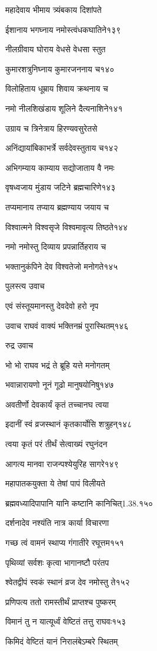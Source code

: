 महादेवाय भीमाय त्र्यंबकाय दिशांपते

ईशानाय भगघ्नाय नमोस्त्वंधकघातिने१३९

नीलग्रीवाय घोराय वेधसे वेधसा स्तुत

कुमारशत्रुनिघ्नाय कुमारजननाय च१४०

विलोहिताय धूम्राय शिवाय क्रथनाय च

नमो नीलशिखंडाय शूलिने दैत्यनाशिने१४१

उग्राय च त्रिनेत्राय हिरण्यवसुरेतसे

अनिंद्यायांबिकाभर्त्रे सर्वदेवस्तुताय च१४२

अभिगम्याय काम्याय सद्योजाताय वै नमः

वृषध्वजाय मुंडाय जटिने ब्रह्मचारिणे१४३

तप्यमानाय तप्याय ब्रह्मण्याय जयाय च

विश्वात्मने विश्वसृजे विश्वमावृत्य तिष्ठते१४४

नमो नमोस्तु दिव्याय प्रपन्नार्तिहराय च

भक्तानुकंपिने देव विश्वतेजो मनोगते१४५

पुलस्त्य उवाच

एवं संस्तूयमानस्तु देवदेवो हरो नृप

उवाच राघवं वाक्यं भक्तिनम्रं पुरास्थितम्१४६

रुद्र उवाच

भो भो राघव भद्रं ते ब्रूहि यत्ते मनोगतम्

भवान्नारायणो नूनं गूढो मानुषयोनिषु१४७

अवतीर्णो देवकार्यं कृतं तच्चानघ त्वया

इदानीं स्वं व्रजस्थानं कृतकार्योसि शत्रुहन्१४८

त्वया कृतं परं तीर्थं सेत्वाख्यं रघुनंदन

आगत्य मानवा राजन्पश्येयुरिह सागरे१४९

महापातकयुक्ता ये तेषां पापं विलीयते

ब्रह्मवध्यादिपापानि यानि कष्टानि कानिचित्1.38.१५०

दर्शनादेव नश्यंति नात्र कार्या विचारणा

गच्छ त्वं वामनं स्थाप्य गंगातीरे रघूत्तम१५१

पृथिव्यां सर्वशः कृत्वा भागानष्टौ परंतप

श्वेतद्वीपं स्वकं स्थानं व्रज देव नमोस्तु ते१५२

प्रणिपत्य ततो रामस्तीर्थं प्राप्तश्च पुष्करम्

विमानं तु न यात्यूर्ध्वं वेष्टितं तत्तु राघवः१५३

किमिदं वेष्टितं यानं निरालंबेऽम्बरे स्थितम्

